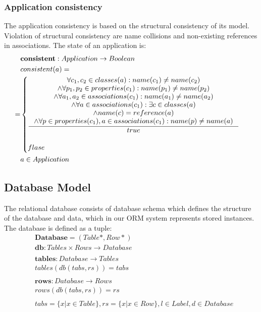 \documentclass[11pt]{article}
\begin{document}
\subsubsection{Application consistency}
The application consistency is based on the structural consistency of its model. Violation of structural consistency are name collisions and non-existing references in associations. The state of an application is:
\begin{align*}
&	\mathbf{consistent} : Application \rightarrow Boolean \\
&	consistent(a)= \\
=&\begin{cases}
	\inference{\forall c_1, c_2 \in classes(a) : name(c_1) \neq name(c_2) \\ \wedge \forall p_1, p_2 \in properties(c_1) : name(p_1) \neq name(p_2) \\ \wedge \forall a_1, a_2 \in associations(c_1) : name(a_1) \neq name (a_2) \\ \wedge \forall a \in associations(c_1) : \exists c \in classes(a) \\ \wedge name(c) = reference(a)\\
	\wedge \forall p \in properties(c_1), a \in associations(c_1) : name(p) \neq name(a) }{true}\\\\
 	flase
 	\end{cases}\\
&	a \in Application
\end{align*}


\subsection{Database Model}
\label{sec:dbModel}
The relational database consists of database schema which defines the structure of the database and data, which in our ORM system represents stored instances. The database is defined as a tuple:
\begin{align*}
&	\mathbf{Database} = ( Table*, Row* ) \\
&	\mathbf{db} : Tables \times Rows \rightarrow Database \\ \\
&	\mathbf{tables} : Database \rightarrow Tables \\
&	tables(db(tabs, rs)) = tabs \\ \\
&	\mathbf{rows} : Database \rightarrow Rows \\
&	rows(db(tabs, rs)) = rs \\ \\
&	tabs  = \{ x | x \in Table\}, rs  = \{ x | x \in Row\}, l \in Label,d \in Database
\end{align*}
\end{document}
